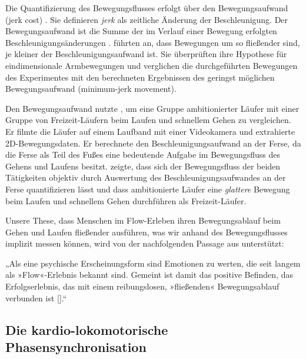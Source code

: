 Die Quantifizierung des Bewegungsflusses erfolgt über den Bewegungsaufwand (jerk cost) \citep{Nelson1983, Hogan1984, Flash1985}. Sie definieren \emph{jerk} als zeitliche Änderung der Beschleunigung. Der Bewegungsaufwand ist die Summe der im Verlauf einer Bewegung erfolgten Beschleunigungsänderungen \citep{Schneider1990}. \citet[][S.~1698]{Flash1985} führten an, dass Bewegungen um so fließender sind, je kleiner der Beschleunigungsaufwand ist. Sie überprüften ihre Hypothese für eindimensionale Armbewegungen und verglichen die durchgeführten Bewegungen des Experimentes mit den berechneten Ergebnissen des geringst möglichen Bewegungsaufwand (minimum-jerk movement).

Den Bewegungsaufwand nutzte \citet{Hreljac2000}, um eine Gruppe ambitionierter Läufer mit einer Gruppe von Freizeit-Läufern beim Laufen und schnellem Gehen zu vergleichen. Er filmte die Läufer auf einem Laufband mit einer Videokamera und extrahierte 2D-Bewegungsdaten. Er berechnete den Beschleunigungsaufwand an der Ferse, da die Ferse als Teil des Fußes eine bedeutende Aufgabe im Bewegungsfluss des Gehens und Laufens besitzt. \citet{Hreljac2000} zeigte, dass sich der Bewegungsfluss der beiden Tätigkeiten objektiv durch Auswertung des Beschleunigungsaufwandes an der Ferse quantifizieren lässt und dass ambitionierte Läufer eine \emph{glattere} Bewegung beim Laufen und schnellem Gehen durchführen als Freizeit-Läufer.

Unsere These, dass Menschen im Flow-Erleben ihren Bewegungsablauf beim Gehen und Laufen fließender ausführen, was wir anhand des Bewegungsflusses implizit messen können, wird von der nachfolgenden Passage aus \citet[][S.~121]{Meinel2007} unterstützt:

„Als eine psychische Erscheinungsform sind Emotionen zu werten, die seit langem als »Flow«-Erlebnis bekannt sind. Gemeint ist damit das positive Befinden, das Erfolgserlebnis, das mit einem reibungslosen, »fließenden« Bewegungsablauf verbunden ist [\textellipsis].“

\subsection{Die kardio-lokomotorische Phasensynchronisation} 

\label{ssub:die_kardio_lokomotorische_phasensynchronisation}

